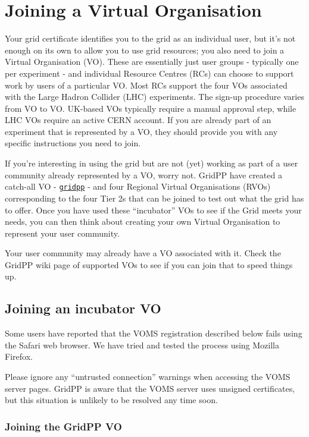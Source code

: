 \documentclass[]{article}
\date{}
\begin{document}
\section{Joining a Virtual
Organisation}\label{joining-a-virtual-organisation}

Your grid certificate identifies you to the grid as an individual user,
but it's not enough on its own to allow you to use grid resources; you
also need to join a Virtual Organisation (VO). These are essentially
just user groups - typically one per experiment - and individual
Resource Centres (RCs) can choose to support work by users of a
particular VO. Most RCs support the four VOs associated with the Large
Hadron Collider (LHC) experiments. The sign-up procedure varies from VO
to VO. UK-based VOs typically require a manual approval step, while LHC
VOs require an active CERN account. If you are already part of an
experiment that is represented by a VO, they should provide you with any
specific instructions you need to join.

If you're interesting in using the grid but are not (yet) working as
part of a user community already represented by a VO, worry not. GridPP
have created a catch-all VO -
\href{https://voms.gridpp.ac.uk:8443/voms/gridpp/}{\texttt{gridpp}} -
and four Regional Virtual Organisations (RVOs) corresponding to the four
Tier 2s that can be joined to test out what the grid has to offer. Once
you have used these ``incubator'' VOs to see if the Grid meets your
needs, you can then think about creating your own Virtual Organisation
to represent your user community.

Your user community may already have a VO associated with it. Check the
GridPP wiki page of supported VOs to see if you can join that to speed
things up.

\subsection{Joining an incubator VO}\label{joining-an-incubator-vo}

Some users have reported that the VOMS registration described below
fails using the Safari web browser. We have tried and tested the process
using Mozilla Firefox.

Please ignore any ``untrusted connection'' warnings when accessing the
VOMS server pages. GridPP is aware that the VOMS server uses unsigned
certificates, but this situation is unlikely to be resolved any time
soon.

\subsubsection{Joining the GridPP VO}\label{joining-the-gridpp-vo}
\end{document}
